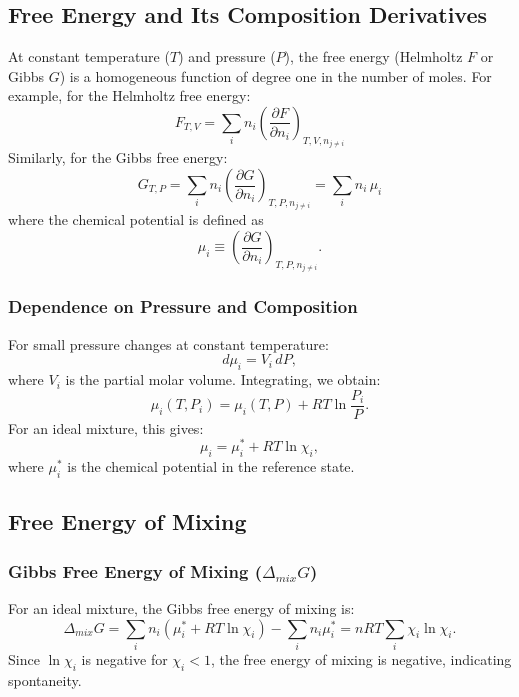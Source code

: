 \documentclass{article}
\theoremstyle{definition}
\begin{document}
\subsection{Free Energy and Its Composition Derivatives}
At constant temperature (\(T\)) and pressure (\(P\)), the free energy (Helmholtz \(F\) or Gibbs \(G\)) is a homogeneous function of degree one in the number of moles. For example, for the Helmholtz free energy:
\begin{equation}
F_{T,V} = \sum_i n_i \left(\frac{\partial F}{\partial n_i}\right)_{T,V,n_{j\neq i}}
\end{equation}
Similarly, for the Gibbs free energy:
\begin{equation}
G_{T,P} = \sum_i n_i \left(\frac{\partial G}{\partial n_i}\right)_{T,P,n_{j\neq i}} = \sum_i n_i\,\mu_i
\end{equation}
where the chemical potential is defined as
\begin{equation}
\mu_i \equiv \left(\frac{\partial G}{\partial n_i}\right)_{T,P,n_{j\neq i}}.
\end{equation}

\subsubsection{Dependence on Pressure and Composition}
For small pressure changes at constant temperature:
\begin{equation}
d\mu_i = V_i\, dP,
\end{equation}
where \(V_i\) is the partial molar volume. Integrating, we obtain:
\begin{equation}
\mu_i(T,P_i) = \mu_i(T,P) + RT \ln\frac{P_i}{P}.
\end{equation}
For an ideal mixture, this gives:
\begin{equation}
\mu_i = \mu_i^* + RT\ln{\chi_i},
\end{equation}
where \(\mu_i^*\) is the chemical potential in the reference state.

\subsection{Free Energy of Mixing}

\subsubsection{Gibbs Free Energy of Mixing (\(\Delta_{mix}G\))}
For an ideal mixture, the Gibbs free energy of mixing is:
\begin{equation}
\Delta_{mix} G = \sum_i n_i \left(\mu_i^* + RT\ln{\chi_i}\right) - \sum_i n_i\mu_i^* = nRT \sum_i \chi_i\ln{\chi_i}.
\end{equation}
Since \(\ln \chi_i\) is negative for \(\chi_i < 1\), the free energy of mixing is negative, indicating spontaneity.
\end{document}
